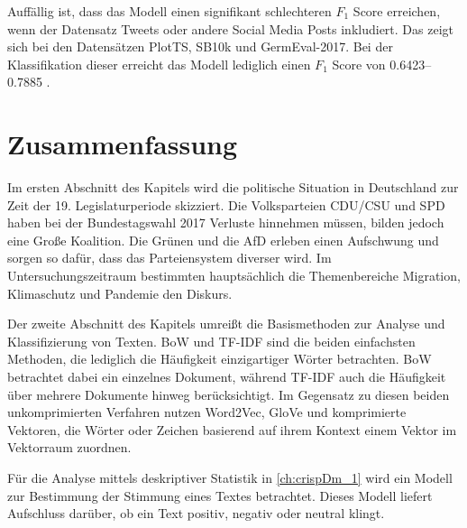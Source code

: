 Auffällig ist, dass das Modell einen signifikant schlechteren $F_1$ Score erreichen, wenn der Datensatz Tweets oder andere Social Media Posts inkludiert. Das zeigt sich bei den Datensätzen PlotTS, SB10k und GermEval-2017. Bei der Klassifikation dieser erreicht das Modell lediglich einen $F_1$ Score von \numrange{0.6423}{0.7885} \autocite[1631]{guhr_training_2020}.

\section{Zusammenfassung}

Im ersten Abschnitt des Kapitels wird die politische Situation in Deutschland zur Zeit der \num{19}. Legislaturperiode skizziert. Die Volksparteien \ac{CDU}/\ac{CSU} und \ac{SPD} haben bei der Bundestagswahl \num{2017} Verluste hinnehmen müssen, bilden jedoch eine Große Koalition. Die Grünen und die \ac{AfD} erleben einen Aufschwung und sorgen so dafür, dass das Parteiensystem diverser wird. Im Untersuchungszeitraum bestimmten hauptsächlich die Themenbereiche Migration, Klimaschutz und Pandemie den Diskurs.

Der zweite Abschnitt des Kapitels umreißt die Basismethoden zur Analyse und Klassifizierung von Texten. \ac{BoW} und \ac{TF-IDF} sind die beiden einfachsten Methoden, die lediglich die Häufigkeit einzigartiger Wörter betrachten. \ac{BoW} betrachtet dabei ein einzelnes Dokument, während \ac{TF-IDF} auch die Häufigkeit über mehrere Dokumente hinweg berücksichtigt. Im Gegensatz zu diesen beiden unkomprimierten Verfahren nutzen Word2Vec, GloVe und \ft komprimierte Vektoren, die Wörter oder Zeichen basierend auf ihrem Kontext einem Vektor im Vektorraum zuordnen.

Für die Analyse mittels deskriptiver Statistik in \autoref{ch:crispDm_1} wird ein Modell zur Bestimmung der Stimmung eines Textes betrachtet. Dieses Modell liefert Aufschluss darüber, ob ein Text positiv, negativ oder neutral klingt.
